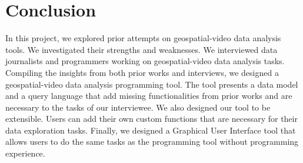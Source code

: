
\section{Conclusion}

In this project, we explored prior attempts on geospatial-video data analysis tools.
We investigated their strengths and weaknesses.
We interviewed data journalists and programmers working on geospatial-video data analysis tasks.
Compiling the insights from both prior works and interviews, we designed a geospatial-video data analysis programming tool.
The tool presents a data model and a query language that add missing functionalities from prior works and are necessary to the tasks of our interviewee.
We also designed our tool to be extensible.
Users can add their own custom functions that are necessary for their data exploration tasks.
Finally, we designed a Graphical User Interface tool that allows users to do the same tasks as the programming tool without programming experience.